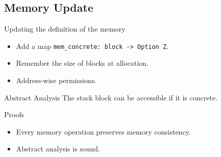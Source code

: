 \def\mixed{
  \begin{figure}
    \centering
    \begin{tikzpicture}[%
        every node/.style={rectangle,minimum size=4pt,minimum height=4pt, inner sep=0pt},
        shorten >=2pt,
        node distance=0.6cm
      ]
      \node [draw] (0) [color=blue, fill] {};
      \node [draw] (1) [circle, color=blue, fill, below=of 0] {};
      \node [draw] (2) [color=blue, fill, below left=of 1] {};
      \node [draw] (3) [color=blue, fill, below=of 1] {};
      \node [draw] (4) [color=blue, fill, below=of 3] {};
      \node [draw] (5) [color=red, fill, right=of 0] {};
      \node [draw] (6) [circle, color=red, fill, below=of 5] {};
      \node [draw] (7) [circle, color=red, fill, below right=of 5] {};
      \node [draw] (8) [color=red, fill, below=of 6] {};
      \node [draw] (9) [color=red, fill, below=of 8] {};
      \node [draw] (10) [color=red, fill, below right=of 8] {};
      \path [draw] (0) edge[->]  node {} (1)
      (1) edge[->]  node {} (2)
      (1) edge[->]  node {} (3)
      (3) edge[->]  node {} (4)
      (5) edge[->]  node {} (6)
      (5) edge[->]  node {} (7)
      (6) edge[->]  node {} (8)
      (8) edge[->]  node {} (9)
      (8) edge[->]  node {} (10);
      \draw[dashed] (0) -- (5);
      \draw[dashed] (1) -- (6);
      \draw[dashed] (3) -- (8);
      \draw[dashed] (4) -- (9);
    \end{tikzpicture}
    \label{fig:mixed}
  \end{figure}
}

\subsection{Memory Update}
\begin{frame}{\subsecname}

  \begin{block}{Updating the definition of the memory}
    \begin{itemize}
    \item Add a map \texttt{mem\_concrete: block -> Option Z}.
    \item Remember the size of blocks at allocation.
    \item Address-wise permissions.
    \end{itemize}
  \end{block}
  \vfill
  \begin{block}{Abstract Analysis}
    The stack block can be accessible if it is concrete.
  \end{block}
    \vfill
    \begin{exampleblock}{Proofs}
      \begin{itemize}
      \item Every memory operation preserves memory consistency.
      \item Abstract analysis is sound.
      \end{itemize}
  \end{exampleblock}

  
\end{frame}

